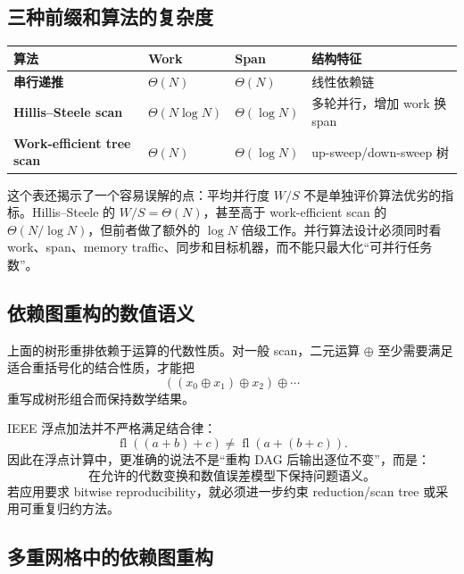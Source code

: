 \subsection{三种前缀和算法的复杂度}

\begin{center}
\small
\begin{tabularx}{0.94\textwidth}{>{\bfseries}p{3.1cm}XXX}
\toprule
算法 & Work & Span & 结构特征\\
\midrule
串行递推 & $\Theta(N)$ & $\Theta(N)$ & 线性依赖链\\
Hillis--Steele scan & $\Theta(N\log N)$ & $\Theta(\log N)$ & 多轮并行，增加 work 换 span\\
Work-efficient tree scan & $\Theta(N)$ & $\Theta(\log N)$ & up-sweep/down-sweep 树\\
\bottomrule
\end{tabularx}
\end{center}

这个表还揭示了一个容易误解的点：平均并行度 $W/S$ 不是单独评价算法优劣的指标。Hillis--Steele 的 $W/S=\Theta(N)$，甚至高于 work-efficient scan 的 $\Theta(N/\log N)$，但前者做了额外的 $\log N$ 倍级工作。并行算法设计必须同时看 work、span、memory traffic、同步和目标机器，而不能只最大化“可并行任务数”。

\subsection{依赖图重构的数值语义}

上面的树形重排依赖于运算的代数性质。对一般 scan，二元运算 $\oplus$ 至少需要满足适合重括号化的结合性质，才能把
\begin{equation}
((x_0\oplus x_1)\oplus x_2)\oplus\cdots
\end{equation}
重写成树形组合而保持数学结果。

IEEE 浮点加法并不严格满足结合律：
\begin{equation}
\operatorname{fl}((a+b)+c)
\neq
\operatorname{fl}(a+(b+c)).
\end{equation}
因此在浮点计算中，更准确的说法不是“重构 DAG 后输出逐位不变”，而是：
\begin{equation}
\boxed{
\text{在允许的代数变换和数值误差模型下保持问题语义。}
}
\label{eq:parallel-semantic-equivalence}
\end{equation}
若应用要求 bitwise reproducibility，就必须进一步约束 reduction/scan tree 或采用可重复归约方法。

\subsection{多重网格中的依赖图重构}

